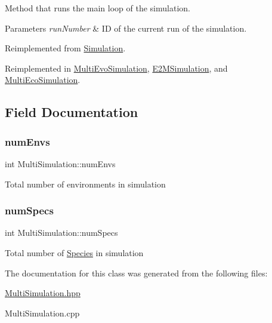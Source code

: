 Method that runs the main loop of the simulation. 


\begin{DoxyParams}{Parameters}
{\em run\+Number} & ID of the current run of the simulation. \\
\hline
\end{DoxyParams}


Reimplemented from \hyperlink{classSimulation_a7eb16da89581b496d33b77efbb63b9cd}{Simulation}.



Reimplemented in \hyperlink{classMultiEvoSimulation_a89c9806ac998c06230cdd41cc6a532bf}{Multi\+Evo\+Simulation}, \hyperlink{classE2MSimulation_aeac4e92c10f89a5c953ace5b1327d20b}{E2\+M\+Simulation}, and \hyperlink{classMultiEcoSimulation_ad490e089c083d06d80c62af9e1564ac3}{Multi\+Eco\+Simulation}.



\subsection{Field Documentation}
\mbox{\label{classMultiSimulation_ac49cc927d6f96d4fda4ff010abc5041a}} 
\subsubsection{\texorpdfstring{num\+Envs}{numEnvs}}
{\footnotesize\ttfamily int Multi\+Simulation\+::num\+Envs\hspace{0.3cm}{\ttfamily [protected]}}

Total number of environments in simulation \mbox{\label{classMultiSimulation_a383fa1e045cf0e1e7314708c89cb6312}} 
\subsubsection{\texorpdfstring{num\+Specs}{numSpecs}}
{\footnotesize\ttfamily int Multi\+Simulation\+::num\+Specs\hspace{0.3cm}{\ttfamily [protected]}}

Total number of \hyperlink{classSpecies}{Species} in simulation 

The documentation for this class was generated from the following files\+:\begin{DoxyCompactItemize}
\item 
\hyperlink{MultiSimulation_8hpp}{Multi\+Simulation.\+hpp}\item 
Multi\+Simulation.\+cpp\end{DoxyCompactItemize}
